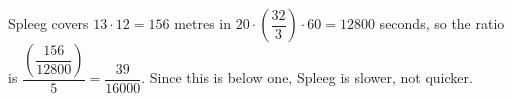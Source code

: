 Spleeg covers $13\cdot12=156$ metres in $20\cdot(\dfrac{32}{3})\cdot60=12800$ seconds, so the ratio is $\dfrac{(\dfrac{156}{12800})}{5}=\boxed{\dfrac{39}{16000}}$. Since this is below one, Spleeg is slower, not quicker.
